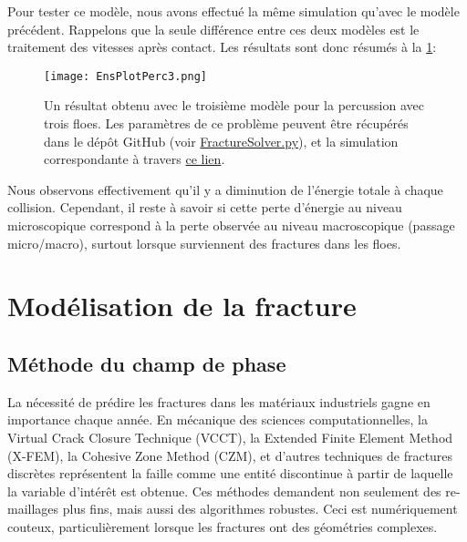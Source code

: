 Pour tester ce modèle, nous avons effectué la même simulation qu'avec le modèle précédent. Rappelons que la seule différence entre ces deux modèles est le traitement des vitesses après contact. Les résultats sont donc résumés à la \cref{fig:frac1d5}:
\begin{figure}[!h]
    \centering
    \texttt{[image: EnsPlotPerc3.png]}
    \caption{Un résultat obtenu avec le troisième modèle pour la percussion avec trois floes. Les paramètres de ce problème peuvent être récupérés dans le dépôt GitHub (voir \href{https://github.com/desmond-rn/ice-floes/blob/master/code/simu1D/FractureSolver.py}{FractureSolver.py}), et la simulation correspondante à travers \href{https://seafile.unistra.fr/f/cc0b8ab472b5458597d2/}{ce lien}.}
    \label{fig:frac1d5}
\end{figure}

Nous observons effectivement qu'il y a diminution de l'énergie totale à chaque collision. Cependant, il reste à savoir si cette perte d'énergie au niveau microscopique correspond à la perte observée au niveau macroscopique (passage micro/macro), surtout lorsque surviennent des fractures dans les floes.







\section{Modélisation de la fracture}


\subsection{Méthode du champ de phase}
\label{subsubsec:approchephase}

La nécessité de prédire les fractures dans les matériaux industriels gagne en importance chaque année. En mécanique des sciences computationnelles, la Virtual Crack Closure Technique (VCCT), la Extended Finite Element Method (X-FEM), la Cohesive Zone Method (CZM), et d'autres techniques de fractures discrètes représentent la faille comme une entité discontinue à partir de laquelle la variable d'intérêt est obtenue. Ces méthodes demandent non seulement des re-maillages plus fins, mais aussi des algorithmes robustes. Ceci est numériquement couteux, particulièrement lorsque les fractures ont des géométries complexes.


